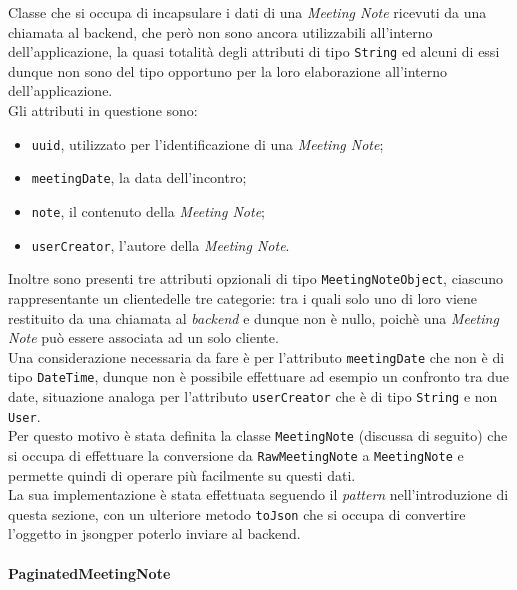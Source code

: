 \noindent Classe che si occupa di incapsulare i dati di una \emph{Meeting Note} ricevuti da una chiamata al \gls{backend}\glsoccur, che però non sono ancora utilizzabili all'interno dell'applicazione, la quasi totalità degli attributi di tipo \lstinline{String} ed alcuni di essi dunque non sono del tipo opportuno per la loro elaborazione all'interno dell'applicazione.\\
Gli attributi in questione sono:
\begin{itemize}
    \item \lstinline{uuid}, utilizzato per l'identificazione di una \emph{Meeting Note};
    \item \lstinline{meetingDate}, la data dell'incontro;
    \item \lstinline{note}, il contenuto della \emph{Meeting Note};
    \item \lstinline{userCreator}, l'autore della \emph{Meeting Note}.
\end{itemize}
Inoltre sono presenti tre attributi opzionali di tipo \lstinline{MeetingNoteObject}, ciascuno rappresentante un \gls{cliente}\glsoccur delle tre categorie: tra i quali solo uno di loro viene restituito da una chiamata al \emph{backend} e dunque non è nullo, poichè una \emph{Meeting Note} può essere associata ad un solo \gls{cliente}\glsoccur.\\
Una considerazione necessaria da fare è per l'attributo \lstinline{meetingDate} che non è di tipo \lstinline{DateTime}\cite{site:date-time}, dunque non è possibile effettuare ad esempio un confronto tra due date, situazione analoga per l'attributo \lstinline{userCreator} che è di tipo \lstinline{String} e non \lstinline{User}.\\
Per questo motivo è stata definita la classe \lstinline{MeetingNote} (discussa di seguito) che si occupa di effettuare la conversione da \lstinline{RawMeetingNote} a \lstinline{MeetingNote} e permette quindi di operare più facilmente su questi dati. \\
La sua implementazione è stata effettuata seguendo il \emph{pattern} nell'introduzione di questa sezione, con un ulteriore metodo \lstinline{toJson} che si occupa di convertire l'oggetto in \gls{jsong}\glsoccur per poterlo inviare al \gls{backend}\glsoccur.

\paragraph*{PaginatedMeetingNote} ~ \\
\label{par:paginated-meeting-note}

